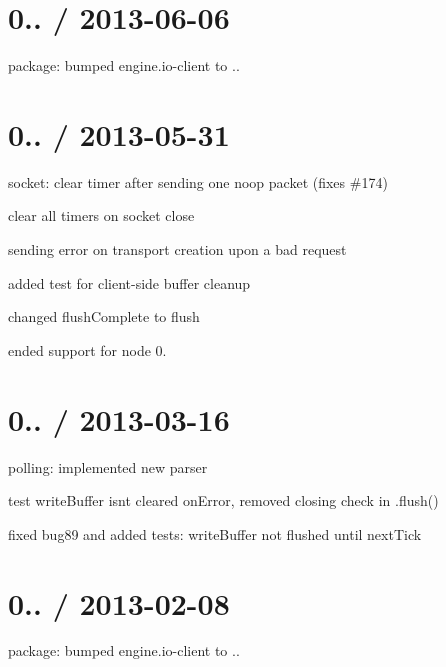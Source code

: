 \section*{0.. / 2013-\/06-\/06 }


\begin{DoxyItemize}
\item package\+: bumped {\ttfamily engine.\+io-\/client} to {..}
\end{DoxyItemize}

\section*{0.. / 2013-\/05-\/31 }


\begin{DoxyItemize}
\item socket\+: clear timer after sending one noop packet (fixes \#174)
\item clear all timers on socket close
\item sending error on transport creation upon a bad request
\item added test for client-\/side buffer cleanup
\item changed flush\+Complete to flush
\item ended support for node 0.
\end{DoxyItemize}

\section*{0.. / 2013-\/03-\/16 }


\begin{DoxyItemize}
\item polling\+: implemented new parser
\item test write\+Buffer isn\textquotesingle{}t cleared on\+Error, removed \textquotesingle{}closing\textquotesingle{} check in .flush()
\item fixed bug89 and added tests\+: write\+Buffer not flushed until next\+Tick
\end{DoxyItemize}

\section*{0.. / 2013-\/02-\/08 }


\begin{DoxyItemize}
\item package\+: bumped {\ttfamily engine.\+io-\/client} to {..}
\end{DoxyItemize}

